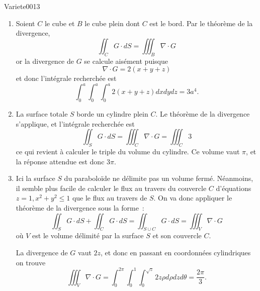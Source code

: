 
\begin{corrige}{Variete0013}



\begin{enumerate}
\item Soient $C$ le cube et $B$ le cube plein dont $C$ est le bord. Par
  le théorème de la divergence,
  \begin{equation*}
    \iint_C G\cdot d S = \iiint_B \nabla\cdot G
  \end{equation*}
  or la divergence de $G$ se calcule aisément puisque
  \begin{equation*}
    \nabla\cdot G = 2(x+y+z)
  \end{equation*}
  et donc l'intégrale recherchée est
  \begin{equation*}
    \int_0^a \int_0^a \int_0^a 2 (x+y+z) d xd y d z= 3 a^4.
  \end{equation*}
\item La surface totale $S$ borde un cylindre plein $C$. Le théorème
  de la divergence s'applique, et l'intégrale recherchée est
  \begin{equation*}
    \iint_S G \cdot d S = \iiint_C \nabla\cdot G = \iiint_C 3
  \end{equation*}
  ce qui revient à calculer le triple du volume du cylindre. Ce volume vaut
  $\pi$, et la réponse attendue est donc $3\pi$.

\item Ici la surface $S$ du paraboloïde ne délimite pas un volume
  fermé. Néanmoins, il semble plus facile de calculer le flux au
  travers du \og couvercle\fg{} $C$ d'équations $z = 1, x^2 + y^2 \leq 1$ que le flux au
  travers de $S$. On va donc appliquer le théorème de la divergence
  sous la forme~:
  \begin{equation*}
    \iint_S G \cdot d S + \iint_C G \cdot d S = \iint_{S \cup C} G \cdot d S =
    \iiint_V \nabla\cdot G
  \end{equation*}
  où $V$ est le volume délimité par la surface $S$ et son couvercle
  $C$.

  La divergence de $G$ vaut $2 z$, et donc en passant en coordonnées
  cylindriques on trouve
  \begin{equation*}
    \iiint_V \nabla\cdot G = \int_0^{2\pi}\int_0^1 \int_0^{\sqrt z} 2 z \rho d \rho
    d z d \theta = \frac{2 \pi}{3}.
  \end{equation*}


\end{enumerate}
\end{corrige}
